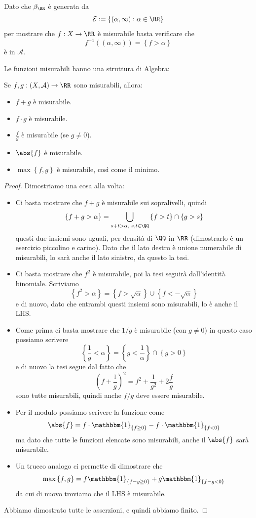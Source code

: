 \documentclass[11pt]{scrartcl}
\begin{document}
	\begin{remark}
		Dato che $\beta_{\RR}$ è generata da 
		$$\mathcal{E}:=\left\{\left(\alpha,\infty\right):\alpha\in\RR\right\}$$
		per mostrare che $f:X\to \RR$ è misurabile basta verificare che $$f^{-1}((\alpha,\infty))=\left\{f>\alpha\right\}$$
		è in $\mathcal{A}$.
	\end{remark}
	Le funzioni misurabili hanno una struttura di Algebra:
	\begin{proposition}
		Se $f,g:\left(X,\mathcal{A}\right)\to\RR$ sono misurabili, allora:
		\begin{itemize}
			\item $f+g$ è misurabile.
			\item $f\cdot g$ è misurabile.
			\item $\frac{f}{g}$ è misurabile (se $g\ne 0$).
			\item $\abs{f}$ è misurabile.
			\item $\max\left\{f,g\right\}$ è misurabile, così come il minimo.
		\end{itemize}
	\end{proposition}
	\begin{proof}
		Dimostriamo una cosa alla volta:
		\begin{itemize}
			\item Ci basta mostrare che $f+g$ è misurabile sui sopralivelli, quindi
			$$\left\{f+g>\alpha\right\}=\bigcup_{s+t>\alpha, \,\, s,t\in \QQ}\left\{f>t\right\}\cap \left\{g>s\right\}$$
			questi due insiemi sono uguali, per densità di $\QQ$ in $\RR$ (dimostrarlo è un esercizio piccolino e carino). Dato che il lato destro è unione numerabile di misurabili, lo sarà anche il lato sinistro, da questo la tesi.
			\item Ci basta mostrare che $f^2$ è misurabile, poi la tesi seguirà dall'identità binomiale. Scriviamo
			$$\left\{f^2>\alpha\right\}=\left\{f>\sqrt{\alpha}\right\}\cup \left\{f<-\sqrt{\alpha}\right\}$$
			e di nuovo, dato che entrambi questi insiemi sono misurabili, lo è anche il LHS.
			\item Come prima ci basta mostrare che $1/g$ è misurabile (con $g\ne 0$) in questo caso possiamo scrivere
			$$\left\{\frac{1}{g}<\alpha\right\}=\left\{g<\frac{1}{\alpha}\right\}\cap \left\{g>0\right\}$$
			e di nuovo la tesi segue dal fatto che
			$$\left(f+\frac{1}{g}\right)^2=f^2+\frac{1}{g^2}+2\frac{f}{g}$$
			sono tutte misurabili, quindi anche $f/g$ deve essere misurabile.
			\item Per il modulo possiamo scrivere la funzione come
			$$\abs{f}=f\cdot \mathbbm{1}_{\left\{f\ge 0\right\}}-f\cdot\mathbbm{1}_{\left\{f<0\right\}}$$
			ma dato che tutte le funzioni elencate sono misurabili, anche il $\abs{f}$ sarà misurabile.
			\item Un trucco analogo ci permette di dimostrare che 
			$$\max\left\{f,g\right\}=f\mathbbm{1}_{\left\{f-g\ge 0\right\}}+g\mathbbm{1}_{\left\{f-g< 0\right\}}$$
			da cui di nuovo troviamo che il LHS è misurabile.
		\end{itemize}
		Abbiamo dimostrato tutte le asserzioni, e quindi abbiamo finito.
	\end{proof}
\end{document}

